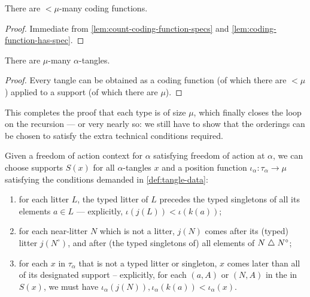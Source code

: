 \begin{corollary}
  \label{cor:count-coding-functions}
  There are $<\mu$-many coding functions.
\end{corollary}

\begin{proof}
  Immediate from \cref{lem:count-coding-function-specs} and \cref{lem:coding-function-has-spec}.
\end{proof}

\begin{corollary}
  \label{cor:count-tangles}
  There are $\mu$-many $\alpha$-tangles.
\end{corollary}

\begin{proof}
  Every tangle can be obtained as a coding function (of which there are $<\mu$) applied to a support (of which there are $\mu$).
\end{proof}

This completes the proof that each type is of size $\mu$, which finally closes the loop on the recursion --- or very nearly so: we still have to show that the orderings can be chosen to satisfy the extra technical conditions required.

\begin{lemma}
  \label{lem:position-functions-propagate}
  Given a freedom of action context for $\alpha$ satisfying freedom of action at $\alpha$, we can choose supports $S(x)$ for all $\alpha$-tangles $x$ and a position function $\iota_\alpha : \tau_\alpha \to \mu$ satisfying the conditions demanded in \cref{def:tangle-data}:
  \begin{enumerate}
    \item for each litter $L$, the typed litter of $L$ precedes the typed singletons of all its elements $a \in L$ --- explicitly, $\iota(j(L)) < \iota(k(a))$;
    \item for each near-litter $N$ which is not a litter, $j(N)$ comes after its (typed) litter $j(N^\circ)$, and after (the typed singletons of) all elements of $N \mathrel{\triangle} N^\circ$;

    \item for each $x$ in $\tau_\alpha$ that is not a typed litter or singleton, $x$ comes later than all of its designated support -- explicitly, for each $(a,A)$ or $(N,A)$ in the in $S(x)$, we must have $\iota_\alpha(j(N)), \iota_\alpha(k(a))<\iota_\alpha(x)$.
  \end{enumerate}
\end{lemma}

